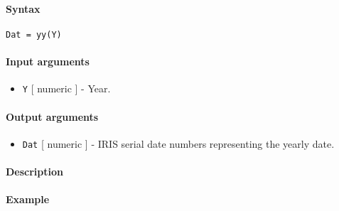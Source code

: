 


	\paragraph{Syntax}

\begin{verbatim}
Dat = yy(Y)
\end{verbatim}

\paragraph{Input arguments}

\begin{itemize}
\itemsep1pt\parskip0pt
\item
  \texttt{Y} {[} numeric {]} - Year.
\end{itemize}

\paragraph{Output arguments}

\begin{itemize}
\itemsep1pt\parskip0pt
\item
  \texttt{Dat} {[} numeric {]} - IRIS serial date numbers representing
  the yearly date.
\end{itemize}

\paragraph{Description}

\paragraph{Example}


